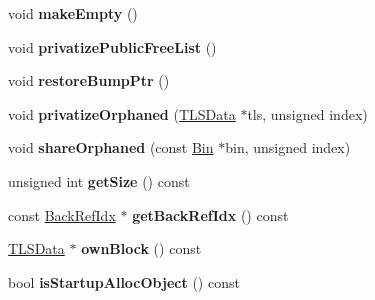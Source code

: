 \begin{DoxyCompactItemize}
\item 
\hypertarget{classrml_1_1internal_1_1Block_a0a7b4a757b19a0189fc6aaddecb2e33f}{}void {\bfseries make\+Empty} ()\label{classrml_1_1internal_1_1Block_a0a7b4a757b19a0189fc6aaddecb2e33f}

\item 
\hypertarget{classrml_1_1internal_1_1Block_a8b9797a7e4e88b7e517c84ad8a00db5c}{}void {\bfseries privatize\+Public\+Free\+List} ()\label{classrml_1_1internal_1_1Block_a8b9797a7e4e88b7e517c84ad8a00db5c}

\item 
\hypertarget{classrml_1_1internal_1_1Block_a5df4dfd201e5dd98c7e542e2ed64d990}{}void {\bfseries restore\+Bump\+Ptr} ()\label{classrml_1_1internal_1_1Block_a5df4dfd201e5dd98c7e542e2ed64d990}

\item 
\hypertarget{classrml_1_1internal_1_1Block_a4fe193f1c1e58be7a5a7be85dce62b2e}{}void {\bfseries privatize\+Orphaned} (\hyperlink{classrml_1_1internal_1_1TLSData}{T\+L\+S\+Data} $\ast$tls, unsigned index)\label{classrml_1_1internal_1_1Block_a4fe193f1c1e58be7a5a7be85dce62b2e}

\item 
\hypertarget{classrml_1_1internal_1_1Block_ae702b24b0163d77834039ee34c0a9260}{}void {\bfseries share\+Orphaned} (const \hyperlink{classrml_1_1internal_1_1Bin}{Bin} $\ast$bin, unsigned index)\label{classrml_1_1internal_1_1Block_ae702b24b0163d77834039ee34c0a9260}

\item 
\hypertarget{classrml_1_1internal_1_1Block_aba02f6abcd7f61ce9b5024e272f94bfe}{}unsigned int {\bfseries get\+Size} () const \label{classrml_1_1internal_1_1Block_aba02f6abcd7f61ce9b5024e272f94bfe}

\item 
\hypertarget{classrml_1_1internal_1_1Block_ab8116bf463d37dd6b4dfeded83effe1a}{}const \hyperlink{classrml_1_1internal_1_1BackRefIdx}{Back\+Ref\+Idx} $\ast$ {\bfseries get\+Back\+Ref\+Idx} () const \label{classrml_1_1internal_1_1Block_ab8116bf463d37dd6b4dfeded83effe1a}

\item 
\hypertarget{classrml_1_1internal_1_1Block_ae446fef4e8f51b93728a92ae63bd0e20}{}\hyperlink{classrml_1_1internal_1_1TLSData}{T\+L\+S\+Data} $\ast$ {\bfseries own\+Block} () const \label{classrml_1_1internal_1_1Block_ae446fef4e8f51b93728a92ae63bd0e20}

\item 
\hypertarget{classrml_1_1internal_1_1Block_a8593670531731ddc8af0a03e7e278572}{}bool {\bfseries is\+Startup\+Alloc\+Object} () const \label{classrml_1_1internal_1_1Block_a8593670531731ddc8af0a03e7e278572}


\end{DoxyCompactItemize}
